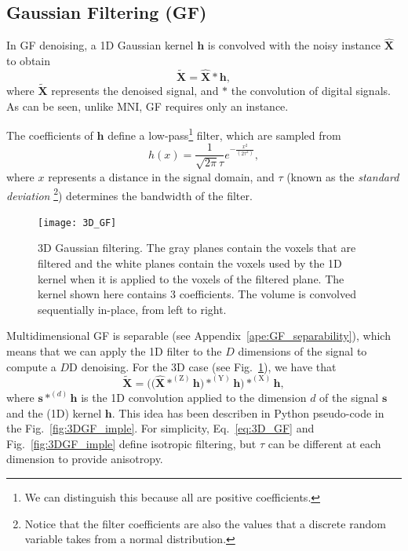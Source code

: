 \documentclass{article}
\begin{document}

\subsection{Gaussian Filtering (GF)}

In GF denoising, a 1D Gaussian kernel $\mathbf{h}$ is convolved with
the noisy instance $\hat{\mathbf{X}}$ to obtain
\begin{equation}
  \tilde{\mathbf{X}} = \hat{\mathbf{X}}*\mathbf{h},
  \label{eq:GF}
\end{equation}
where $\tilde{\mathbf{X}}$ represents the denoised signal, and $*$ the
convolution of digital signals. As can be seen, unlike MNI, GF
requires only an instance.

The coefficients of $\mathbf{h}$ define a low-pass\footnote{We can
  distinguish this because all are positive coefficients.}
filter, which are sampled from
\begin{equation}
  h(x) = \frac{1}{\sqrt{2\pi}\tau}e^{-\frac{{x}^2}{(2\tau^2)}},
  \label{eq:GK}
\end{equation}
where $x$ represents a distance in
the signal domain, and $\tau$ (known as the \emph{standard deviation}
\footnote{Notice that the filter coefficients are also the values that a
  discrete random variable takes from a normal distribution.})
determines the bandwidth of the filter.

\begin{figure}
  \centering
  \texttt{[image: 3D\_GF]}
  \caption{3D Gaussian filtering. The gray planes contain the voxels
    that are filtered and the white planes contain the voxels used by
    the 1D kernel when it is applied to the voxels of the filtered
    plane. The kernel shown here contains 3 coefficients. The volume
    is convolved sequentially in-place, from left to
    right.\label{fig:3D_GF}}
\end{figure}

Multidimensional GF is separable (see
Appendix~\ref{ape:GF_separability}), which means that we
can apply the 1D filter to the $D$ dimensions of the signal to compute
a $D$D denoising. For the 3D case (see Fig.~\ref{fig:3D_GF}), we have
that
\begin{equation}
  \tilde{\mathbf{X}} = \Big(\big(\hat{\mathbf X}*^{(\text{Z})}{\mathbf h}\big)*^{(\text{Y})}{\mathbf h}\Big)*^{(\text{X})}{\mathbf h},
    \label{eq:3D_GF}
\end{equation}
where ${\mathbf s}*^{(d)}{\mathbf h}$ is the 1D convolution applied to
the dimension $d$ of the signal ${\mathbf s}$ and the (1D) kernel
${\mathbf h}$.  This idea has been describen in Python pseudo-code in
the Fig.~\ref{fig:3DGF_imple}. For simplicity, Eq.~\ref{eq:3D_GF} and
Fig.~\ref{fig:3DGF_imple} define isotropic filtering, but $\tau$ can
be different at each dimension to provide anisotropy.
\end{document}
